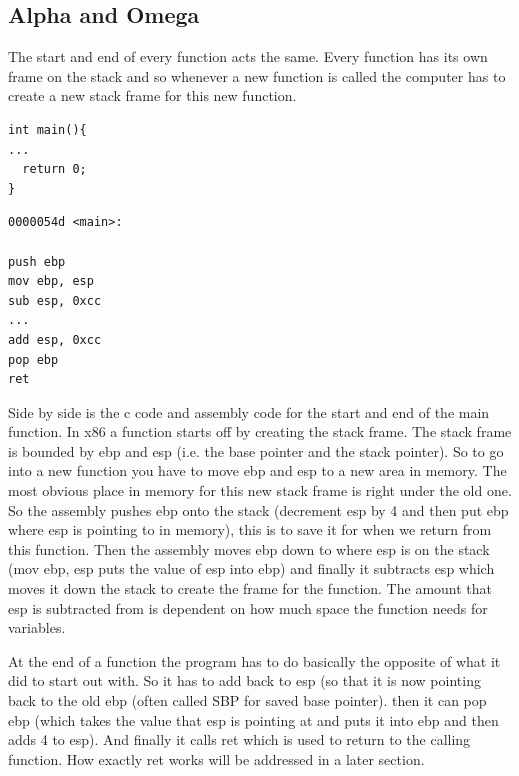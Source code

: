 \documentclass{report}
\begin{document}
\subsection{Alpha and Omega}
The start and end of every function acts the same.  Every function has its own frame on the stack and so whenever a new function is called the computer has to create a new stack frame for this new function.  
\newline\begin{minipage}{.45\textwidth}
\begin{lstlisting}
int main(){
...
  return 0;
}
\end{lstlisting}
\end{minipage}\hfill
\begin{minipage}{.45\textwidth}
\begin{lstlisting}
0000054d <main>:

push ebp
mov ebp, esp
sub esp, 0xcc
...
add esp, 0xcc
pop ebp
ret
\end{lstlisting}
\end{minipage}\newline
Side by side is the c code and assembly code for the start and end of the main function.  In x86 a function starts off by creating the stack frame.  
The stack frame is bounded by ebp and esp (i.e. the base pointer and the stack pointer).  So to go into a new function you have to move ebp and esp to a new area in memory.  The most obvious place in memory for this new stack frame is right under the old one.  So the assembly pushes ebp onto the stack (decrement esp by 4 and then put ebp where esp is pointing to in memory), this is to save it for when we return from this function.  Then the assembly moves ebp down to where esp is on the stack (mov ebp, esp puts the value of esp into ebp) and finally it subtracts esp which moves it down the stack to create the frame for the function.  The amount that esp is subtracted from is dependent on how much space the function needs for variables.

At the end of a function the program has to do basically the opposite of what it did to start out with.  So it has to add back to esp (so that it is now pointing back to the old ebp (often called SBP for saved base pointer).  then it can pop ebp (which takes the value that esp is pointing at and puts it into ebp and then adds 4 to esp).  And finally it calls ret which is used to return to the calling function.  How exactly ret works will be addressed in a later section. 
\end{document}
